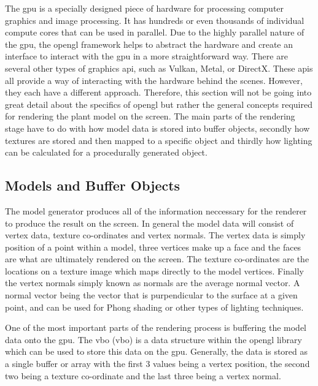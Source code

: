 The \acrshort{gpu} is a specially designed piece of hardware for processing computer graphics and image processing. It has hundreds or even thousands of individual compute cores that can be used in parallel. Due to the highly parallel nature of the \acrshort{gpu}, the \acrshort{opengl} framework helps to abstract the hardware and create an interface to interact with the \acrshort{gpu} in a more straightforward way. There are several other types of graphics \acrshort{api}, such as Vulkan, Metal, or DirectX. These \acrshort{api}s all provide a way of interacting with the hardware behind the scenes. However, they each have a different approach. Therefore, this section will not be going into great detail about the specifics of \acrshort{opengl} but rather the general concepts required for rendering the plant model on the screen. The main parts of the rendering stage have to do with how model data is stored into buffer objects, secondly how textures are stored and then mapped to a specific object and thirdly how lighting can be calculated for a procedurally generated object.

\subsection{Models and Buffer Objects}

The model generator produces all of the information neccessary for the renderer to produce the result on the screen. In general the model data will consist of vertex data, texture co-ordinates and vertex normals. The vertex data is simply position of a point within a model, three vertices make up a face and the faces are what are ultimately rendered on the screen. The texture co-ordinates are the locations on a texture image which maps directly to the model vertices. Finally the vertex normals simply known as normals are the average normal vector. A normal vector being the vector that is purpendicular to the surface at a given point, and can be used for Phong shading or other types of lighting techniques.  

One of the most important parts of the rendering process is buffering the model data onto the \acrshort{gpu}. The \acrlong{vbo} (\acrshort{vbo}) is a data structure within the \acrshort{opengl} library which can be used to store this data on the \acrshort{gpu}. Generally, the data is stored as a single buffer or array with the first 3 values being a vertex position, the second two being a texture co-ordinate and the last three being a vertex normal. 

